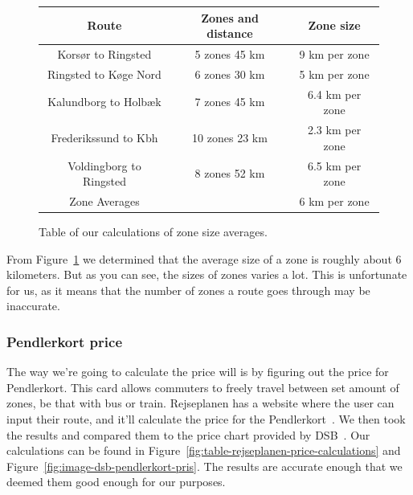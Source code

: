 \begin{figure}[H]
    \centering
    \noindent
    \begin{tabular}{ || c | c | c || }
        \hline
        Route & Zones and distance & Zone size \\
        \hline\hline
        Korsør to Ringsted & 5 zones 45 km & 9 km per zone \\
        \hline
        Ringsted to Køge Nord & 6 zones 30 km & 5 km per zone \\
        \hline
        Kalundborg to Holbæk & 7 zones 45 km & 6.4 km per zone \\
        \hline
        Frederikssund to Kbh & 10 zones 23 km & 2.3 km per zone \\
        \hline
        Voldingborg to Ringsted & 8 zones 52 km & 6.5 km per zone \\
        \hline\hline
        Zone Averages & & 6 km per zone \\
        \hline
    \end{tabular}
    \caption{Table of our calculations of zone size averages.}
    \label{fig:table-zone-size-averages}
\end{figure}

From Figure~\ref{fig:table-zone-size-averages} we determined that the average size of a zone is roughly about 6
kilometers.
But as you can see, the sizes of zones varies a lot.
This is unfortunate for us, as it means that the number of zones a route goes through may be inaccurate.

\subsubsection{Pendlerkort price}

The way we're going to calculate the price will is by figuring out the price for Pendlerkort.
This card allows commuters to freely travel between set amount of zones, be that with bus or train.
Rejseplanen has a website where the user can input their route, and it'll calculate the price for the
Pendlerkort~\cite{price_calculator}.
We then took the results and compared them to the price chart provided by DSB~\cite{price_sheet}.
Our calculations can be found in Figure~\ref{fig:table-rejseplanen-price-calculations} and
Figure~\ref{fig:image-dsb-pendlerkort-pris}.
The results are accurate enough that we deemed them good enough for our purposes.

